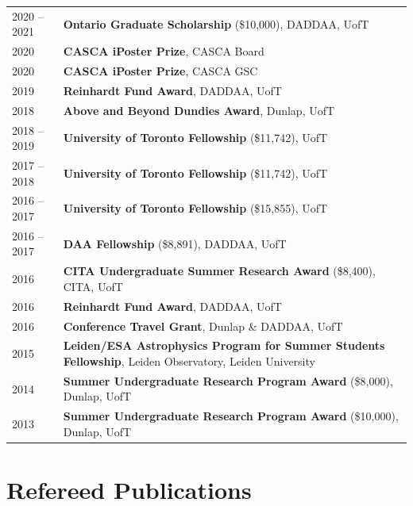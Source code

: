 \documentclass[10pt]{res} %
\begin{document}
\begin{resume}
\begin{table}[h!]
\begin{tabularx}{\textwidth}{lX}
2020 -- 2021 & \textbf{Ontario Graduate Scholarship} (\$10,000), DADDAA, UofT  \\
2020 & \textbf{CASCA iPoster Prize}, CASCA Board \\
2020 & \textbf{CASCA iPoster Prize}, CASCA GSC \\
2019 & \textbf{Reinhardt Fund Award}, DADDAA, UofT \\
2018 & \textbf{Above and Beyond Dundies Award}, Dunlap, UofT \\
2018 -- 2019 & \textbf{University of Toronto Fellowship} (\$11,742), UofT \\
2017 -- 2018 & \textbf{University of Toronto Fellowship} (\$11,742), UofT \\
2016 -- 2017 & \textbf{University of Toronto Fellowship} (\$15,855), UofT \\
2016 -- 2017 & \textbf{DAA Fellowship} (\$8,891), DADDAA, UofT \\
2016 & \textbf{CITA Undergraduate Summer Research Award} (\$8,400), CITA, UofT \\
2016 & \textbf{Reinhardt Fund Award}, DADDAA, UofT \\
2016 & \textbf{Conference Travel Grant}, Dunlap \& DADDAA, UofT \\
2015 & \textbf{Leiden/ESA Astrophysics Program for Summer Students Fellowship}, Leiden Observatory, Leiden University \\
2014 & \textbf{Summer Undergraduate Research Program Award} (\$8,000), Dunlap, UofT \\
2013 & \textbf{Summer Undergraduate Research Program Award} (\$10,000), Dunlap, UofT
\end{tabularx}
\end{table}


\section{\Large Refereed Publications}
\vspace{-5pt} %
\noindent\makebox[\linewidth]{\rule{\textwidth}{0.4pt}}
\vspace{-20pt} %


\end{resume}
\end{document}
